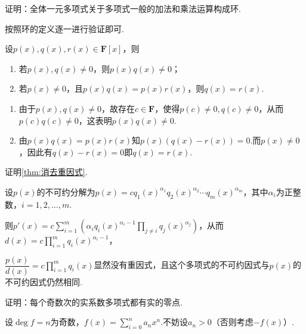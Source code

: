 \begin{exercise}

    \begin{exgroup}
        \item 证明：全体一元多项式关于多项式一般的加法和乘法运算构成环.
        \begin{answer}
            按照环的定义逐一进行验证即可.
        \end{answer}
        \item 设$p(x),q(x),r(x)\in\mathbf{F}[x]$，则
        \begin{enumerate}
            \item 若$p(x),q(x)\neq 0$，则$p(x)q(x)\neq 0$；
            \item 若$p(x)\neq 0$，且$p(x)q(x)=p(x)r(x)$，则$q(x)=r(x)$.
        \end{enumerate}
        \begin{answer}
            \begin{enumerate}
                \item 由于$p(x),q(x)\neq 0$，故存在$c\in \mathbf{F}$，使得$p(c)\neq 0,q(c)\neq 0$，从而$p(c)q(c)\neq0$，这表明$p(x)q(x)\neq 0$.
                \item 由$p(x)q(x)=p(x)r(x)$知$p(x)(q(x)-r(x))=0$.而$p(x)\neq0$，因此有$q(x)-r(x)=0$即$q(x)=r(x)$.
            \end{enumerate}
        \end{answer}
        \item 证明\autoref{thm:消去重因式}.
        \begin{answer}
            设$p(x)$的不可约分解为$p(x)=cq_1(x)^{\alpha_1}q_2(x)^{\alpha_2}\cdots q_m(x)^{\alpha_m}$，其中$\alpha_i$为正整数，$i=1,2,\ldots,m$.

            则$p'(x)=c\displaystyle\sum_{i=1}^{m}(\alpha_i q_i(x)^{\alpha_i-1}\displaystyle\prod_{j\neq i}q_j(x)^{\alpha_j})$，从而$\displaystyle d(x)=c\prod_{i=1}^{m}q_i(x)^{\alpha_i-1}$，

            $\displaystyle\dfrac{p(x)}{d(x)}=c\prod_{i=1}^{m}q_i(x)$显然没有重因式，且这个多项式的不可约因式与$p(x)$的不可约因式仍然相同.
        \end{answer}
        \item 证明：每个奇数次的实系数多项式都有实的零点.
        \begin{answer}
            设$\deg f=n$为奇数，$f(x)=\displaystyle\sum_{i=0}^{n}a_nx^n$.不妨设$a_n>0$（否则考虑$-f(x)$）.


\end{answer}
\end{exgroup}
\end{exercise}
